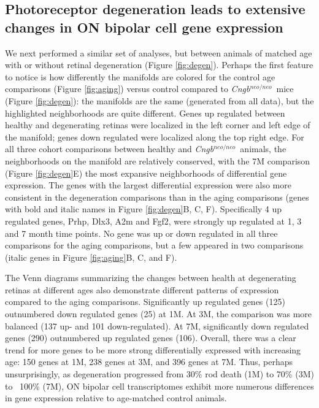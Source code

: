\documentclass[11pt, a4paper]{article}
\newcommand{\cngb}{\textit{Cngb$^{neo/neo}$}~}
\begin{document}
\subsection*{Photoreceptor degeneration leads to extensive changes in ON bipolar cell gene expression} 

We next performed a similar set of analyses, but between animals of matched age with or without retinal degeneration (Figure \ref{fig:degen}). Perhaps the first feature to notice is how differently the manifolds are colored for the control age comparisons (Figure \ref{fig:aging}) versus control compared to \cngb mice (Figure \ref{fig:degen}): the manifolds are the same (generated from all data), but the highlighted neighborhoods are quite different. Genes up regulated between healthy and degenerating retinas were localized in the left corner and left edge of the manifold; genes down regulated were localized along the top right edge. For all three cohort comparisons between healthy and \cngb animals, the neighborhoods on the manifold are relatively conserved, with the 7M comparison (Figure \ref{fig:degen}E) the most expansive neighborhoods of differential gene expression. The genes with the largest differential expression were also more consistent in the degeneration comparisons than in the aging comparisons (genes with bold and italic names in Figure \ref{fig:degen}B, C, F). Specifically 4 up regulated genes, Prhp, Dlx3, A2m and Fgf2, were strongly up regulated at 1, 3 and 7 month time points. No gene was up or down regulated in all three comparisons for the aging comparisons, but a few appeared in two comparisons (italic genes in Figure \ref{fig:aging}B, C, and F). 

The Venn diagrams summarizing the changes between health at degenerating retinas at different ages also demonstrate different patterns of expression compared to the aging comparisons. Significantly up regulated genes (125) outnumbered down regulated genes (25) at 1M. At 3M, the comparison was more balanced (137 up- and 101 down-regulated). At 7M, significantly down regulated genes (290) outnumbered up regulated genes (106). Overall, there was a clear trend for more genes to be more strong differentially expressed with increasing age: 150 genes at 1M, 238 genes at 3M, and 396 genes at 7M. Thus, perhaps unsurprisingly, as degeneration progressed from 30\% rod death (1M) to 70\% (3M) to ~100\% (7M), ON bipolar cell transcriptomes exhibit more numerous differences in gene expression relative to age-matched control animals. 
\end{document}

